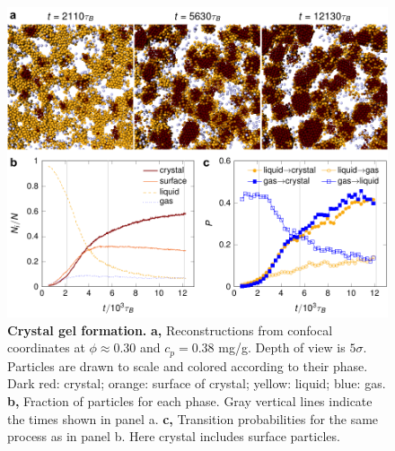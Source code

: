 \documentclass[preprint,amsmath,amssymb,superscriptaddress]{revtex4}
\begin{document}
\clearpage 

\begin{figure}
 \centering
 \includegraphics{crystal}
 \caption{
{\bf Crystal gel formation.}  
{\bf a,} Reconstructions from confocal coordinates at $\phi\approx 0.30$ and $c_p=0.38$ mg/g. Depth of view is $5\sigma$. Particles are drawn to scale and colored according to their phase. Dark red: crystal; orange: surface of crystal; yellow: liquid; blue: gas. 
{\bf b,} Fraction of particles for each phase. Gray vertical lines indicate the times shown in panel a. 
{\bf c,} Transition probabilities for the same process as in panel b. Here crystal includes surface particles.}
\label{fig:transitions}
\end{figure}
\end{document}
